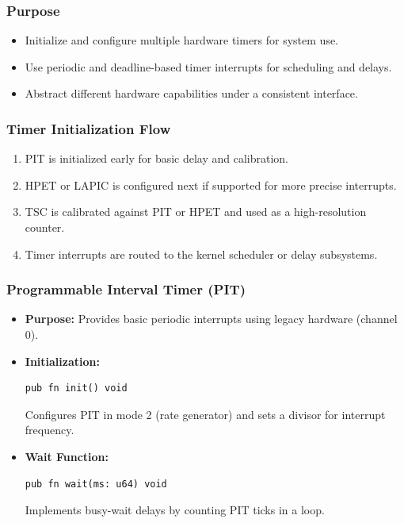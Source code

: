 \documentclass[12pt]{extarticle}
\begin{document}
\subsubsection*{Purpose}

\begin{itemize}
    \item Initialize and configure multiple hardware timers for system use.
    \item Use periodic and deadline-based timer interrupts for scheduling and delays.
    \item Abstract different hardware capabilities under a consistent interface.
\end{itemize}

\subsubsection*{Timer Initialization Flow}

\begin{enumerate}
    \item PIT is initialized early for basic delay and calibration.
    \item HPET or LAPIC is configured next if supported for more precise interrupts.
    \item TSC is calibrated against PIT or HPET and used as a high-resolution counter.
    \item Timer interrupts are routed to the kernel scheduler or delay subsystems.
\end{enumerate}

\subsubsection*{Programmable Interval Timer (PIT)}

\begin{itemize}
    \item \textbf{Purpose:} Provides basic periodic interrupts using legacy hardware (channel 0).
    
    \item \textbf{Initialization:}
    \begin{lstlisting}[language=zig]
    pub fn init() void
    \end{lstlisting}
    Configures PIT in mode 2 (rate generator) and sets a divisor for interrupt frequency.

    \item \textbf{Wait Function:}
    \begin{lstlisting}[language=zig]
    pub fn wait(ms: u64) void
    \end{lstlisting}
    Implements busy-wait delays by counting PIT ticks in a loop.
\end{itemize}
\end{document}
